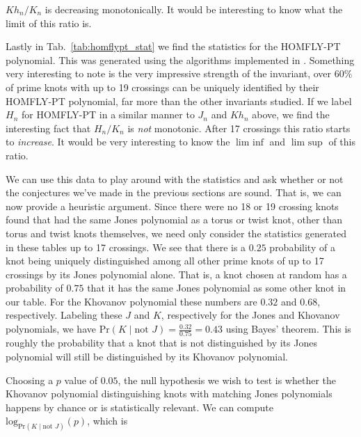     $Kh_{n}/K_{n}$ is decreasing monotonically. It would be interesting to
    know what the limit of this ratio is.
    \par\hfill\par
    Lastly in Tab.~\ref{tab:homflypt_stat} we find the statistics for the
    HOMFLY-PT polynomial. This was generated using the algorithms implemented
    in \cite{regina}. Something very interesting to note is the very impressive
    strength of the invariant, over $60\%$ of prime knots with up to 19
    crossings can be uniquely identified by their HOMFLY-PT polynomial, far
    more than the other invariants studied. If we label $H_{n}$ for HOMFLY-PT
    in a similar manner to $J_{n}$ and $Kh_{n}$ above, we find the interesting
    fact that $H_{n}/K_{n}$ is \textit{not} monotonic. After 17 crossings this
    ratio starts to \textit{increase}. It would be very interesting to
    know the $\lim\textrm{ inf}$ and $\lim\textrm{ sup}$ of this ratio.
    \par\hfill\par
    We can use this data to play around with the statistics and ask whether or
    not the conjectures we've made in the previous sections are sound. That is,
    we can now provide a heuristic argument.
    Since there were no 18 or 19 crossing knots
    found that had the same Jones polynomial as a torus or twist knot, other
    than torus and twist knots themselves, we need only consider the statistics
    generated in these tables up to 17 crossings. We see that there is a
    $0.25$ probability of a knot being uniquely distinguished among all
    other prime knots of up to 17 crossings by its Jones polynomial alone.
    That is, a knot chosen at random has a probability of $0.75$ that it has
    the same Jones polynomial as some other knot in our table. For the Khovanov
    polynomial these numbers are $0.32$ and $0.68$, respectively. Labeling
    these $J$ and $K$, respectively for the Jones and Khovanov polynomials,
    we have $\textrm{Pr}(K\;|\;\textrm{not }J)=\frac{0.32}{0.75}=0.43$ using
    Bayes' theorem. This
    is roughly the probability that a knot that is not distinguished by its
    Jones polynomial will still be distinguished by its Khovanov polynomial.
    \par\hfill\par
    Choosing a $p$ value of $0.05$, the null hypothesis we wish to test is
    whether the Khovanov polynomial distinguishing knots with matching Jones
    polynomials happens by chance or is statistically relevant. We can compute
    $\textrm{log}_{\textrm{Pr}(K\;|\;\textrm{not }J)}(p)$, which is
